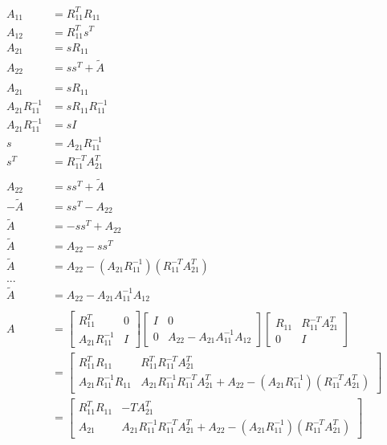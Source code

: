 \documentclass{article}
\begin{document}
	\begin{align*}
	A_{11} &= R_{11}^TR_{11}\\
	A_{12} &= R_{11}^Ts^T\\
	A_{21} &= sR_{11}\\
	A_{22} &= ss^T+\tilde{A}\\
	\\
	A_{21} &= sR_{11}\\
	A_{21}R_{11}^{-1} &= sR_{11}R_{11}^{-1}\\	
	A_{21}R_{11}^{-1} &= sI\\	
	s &= A_{21}R_{11}^{-1}\\		
	s^T &= R_{11}^{-T}A_{21}^T\\			
	\\
	A_{22} &= ss^T+\tilde{A}\\
	-\tilde{A} &= ss^T-A_{22}\\
	\tilde{A} &= -ss^T+A_{22}\\	
	\tilde{A} &= A_{22} - ss^T\\
	\tilde{A} &= A_{22} - (A_{21}R_{11}^{-1})(R_{11}^{-T}A_{21}^T)\\
	...\\
	\tilde{A} &= A_{22} - A_{21}A_{11}^{-1}A_{12}\\	
	\\
	A&=\begin{bmatrix}R_{11}^T&0\\A_{21}R_{11}^{-1}&I\end{bmatrix}\begin{bmatrix}I&0\\0&A_{22} - A_{21}A_{11}^{-1}A_{12}\end{bmatrix}\begin{bmatrix}R_{11}&R_{11}^{-T}A_{21}^T\\0&I\end{bmatrix}\\
	&=\begin{bmatrix}R_{11}^TR_{11}&R_{11}^TR_{11}^{-T}A_{21}^T\\ A_{21}R_{11}^{-1}R_{11}&A_{21}R_{11}^{-1}R_{11}^{-T}A_{21}^T+A_{22} - (A_{21}R_{11}^{-1})(R_{11}^{-T}A_{21}^T)\end{bmatrix}\\
	&=\begin{bmatrix}R_{11}^TR_{11}&{-T}A_{21}^T\\ A_{21}&A_{21}R_{11}^{-1}R_{11}^{-T}A_{21}^T+A_{22} - (A_{21}R_{11}^{-1})(R_{11}^{-T}A_{21}^T)\end{bmatrix}\\
	\end{align*}
\end{document}

